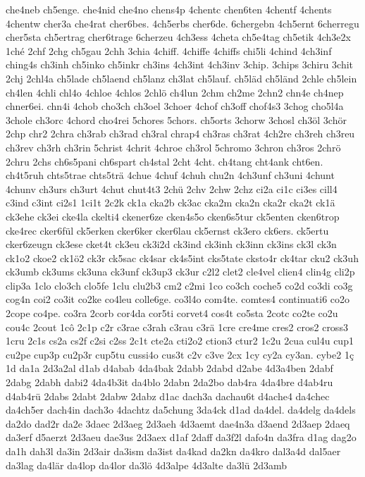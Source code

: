 {che4neb
ch5enge.
che4nid
che4no
chens4p
4chentc
chen6ten
4chentf
4chents
4chentw
cher3a
che4rat
cher6bes.
4ch5erbs
cher6de.
6chergebn
4ch5ernt
6cherregu
cher5sta
ch5ertrag
cher6trage
6cherzeu
4ch3ess
4cheta
ch5e4tag
ch5etik
4ch3e2x
1ché
2chf
2chg
ch5gau
2chh
3chia
4chiff.
4chiffe
4chiffs
chi5li
4chind
4ch3inf
ching4s
ch3inh
ch5inko
ch5inkr
ch3ins
4ch3int
4ch3inv
3chip.
3chips
3chiru
3chit
2chj
2chl4a
ch5lade
ch5laend
ch5lanz
ch3lat
ch5lauf.
ch5läd
ch5länd
2chle
ch5lein
ch4len
4chli
chl4o
4chloe
4chlos
2chlö
ch4lun
2chm
ch2me
2chn2
chn4e
ch4nep
chner6ei.
chn4i
4chob
cho3ch
ch3oel
3choer
4chof
ch3off
chof4s3
3chog
cho5l4a
3chole
ch3orc
4chord
cho4rei
5chores
5chors.
ch5orts
3chorw
3chosl
ch3öl
3chör
2chp
chr2
2chra
ch3rab
ch3rad
ch3ral
chrap4
ch3ras
ch3rat
4ch2re
ch3reh
ch3reu
ch3rev
ch3rh
ch3rin
5christ
4chrit
4chroe
ch3rol
5chromo
3chron
ch3ros
2chrö
2chru
2chs
ch6s5pani
ch6spart
ch4stal
2cht
4cht.
ch4tang
cht4ank
cht6en.
ch4t5ruh
chts5trae
chts5trä
4chue
4chuf
4chuh
chu2n
4ch3unf
ch3uni
4chunt
4chunv
ch3urs
ch3urt
4chut
chut4t3
2chü
2chv
2chw
2chz
ci2a
ci1c
ci3es
cill4
c3ind
c3int
ci2s1
1ci1t
2c2k
ck1a
cka2b
ck3ac
cka2m
cka2n
cka2r
cka2t
ck1ä
ck3ehe
ck3ei
cke4la
ckelti4
ckener6ze
cken4s5o
cken6s5tur
ck5enten
cken6trop
cke4rec
cker6fül
ck5erken
cker6ker
cker6lau
ck5ernst
ck3ero
ck6ers.
ck5ertu
cker6zeugn
ck3ese
cket4t
ck3eu
ck3i2d
ck3ind
ck3inh
ck3inn
ck3ins
ck3l
ck3n
ck1o2
ckoe2
ck1ö2
ck3r
ck5sac
ck4sar
ck4s5int
cks5tate
cksto4r
ck4tar
cku2
ck3uh
ck3umb
ck3ums
ck3una
ck3unf
ck3up3
ck3ur
c2l2
clet2
cle4vel
clien4
clin4g
cli2p
clip3a
1clo
clo3ch
clo5fe
1clu
clu2b3
cm2
c2mi
1co
co3ch
coche5
co2d
co3di
co3g
cog4n
coi2
co3it
co2ke
co4leu
colle6ge.
co3l4o
com4te.
comtes4
continuati6
co2o
2cope
co4pe.
co3ra
2corb
cor4da
cor5ti
corvet4
cos4t
co5sta
2cotc
co2te
co2u
cou4c
2cout
1cô
2c1p
c2r
c3rae
c3rah
c3rau
c3rä
1cre
cre4me
cres2
cros2
cross3
1cru
2c1s
cs2a
cs2f
c2si
c2ss
2c1t
cte2a
cti2o2
ction3
ctur2
1c2u
2cua
cul4u
cup1
cu2pe
cup3p
cu2p3r
cup5tu
cussi4o
cus3t
c2v
c3ve
2cx
1cy
cy2a
cy3an.
cybe2
1ç
1d
da1a
2d3a2al
d1ab
d4abab
4da4bak
2dabb
2dabd
d2abe
4d3a4ben
2dabf
2dabg
2dabh
dabi2
4da4b3it
da4blo
2dabn
2da2bo
dab4ra
4da4bre
d4ab4ru
d4ab4rü
2dabs
2dabt
2dabw
2dabz
d1ac
dach3a
dachau6t
d4ache4
da4chec
da4ch5er
dach4in
dach3o
4dachtz
da5chung
3da4ck
d1ad
da4del.
da4delg
da4dels
da2do
dad2r
da2e
3daec
2d3aeg
2d3aeh
4d3aemt
dae4n3a
d3aend
2d3aep
2daeq
da3erf
d5aerzt
2d3aeu
dae3us
2d3aex
d1af
2daff
da3f2l
dafo4n
da3fra
d1ag
dag2o
da1h
dah3l
da3in
2d3air
da3ism
da3ist
da4kad
da2kn
da4kro
dal3a4d
dal5aer
da3lag
da4lär
da4lop
da4lor
da3lö
4d3alpe
4d3alte
da3lü
2d3amb
}
